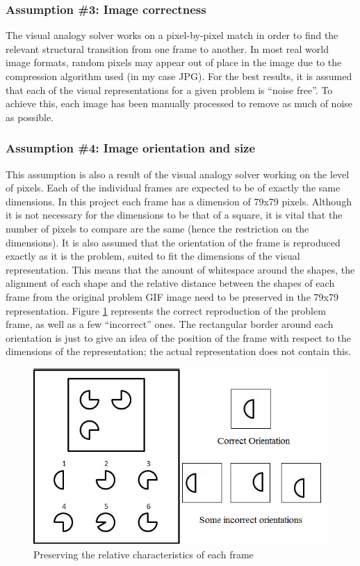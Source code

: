 \documentclass[10pt, letter]{article}
\begin{document}
	\subsubsection*{Assumption \#3: Image correctness}
The visual analogy solver works on a pixel-by-pixel match in order to find the relevant structural transition from one frame to another. In most real world image formats, random pixels may appear out of place in the image due to the compression algorithm used (in my case JPG). For the best results, it is assumed that each of the visual representations for a given problem is ``noise free''. To achieve this, each image has been manually processed to remove as much of noise as possible.
	\subsubsection*{Assumption \#4: Image orientation and size}
This assumption is also a result of the visual analogy solver working on the level of pixels. Each of the individual frames are expected to be of exactly the same dimensions. In this project each frame has a dimension of 79x79 pixels. Although it is not necessary for the dimensions to be that of a square, it is vital that the number of pixels to compare are the same (hence the restriction on the dimensions). It is also assumed that the orientation of the frame is reproduced exactly as it is the problem, suited to fit the dimensions of the visual representation. This means that the amount of whitespace around the shapes, the alignment of each shape and the relative distance between the shapes of each frame from the original problem GIF image need to be preserved in the 79x79 representation. Figure \ref{fig3} represents the correct reproduction of the problem frame, as well as a few ``incorrect'' ones. The rectangular border around each orientation is just to give an idea of the position of the frame with respect to the dimensions of the representation; the actual representation does not contain this.
\begin{figure}[h!]
  \centering
    \includegraphics[scale = 0.5]{Images/Fig3}
    \caption{Preserving the relative characteristics of each frame}
  \label{fig3}
\end{figure}
\end{document}
